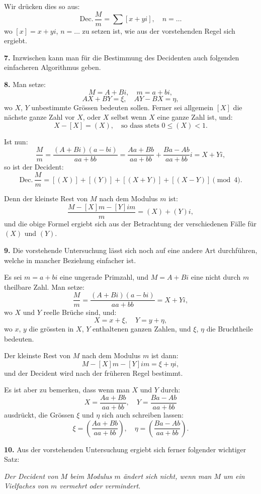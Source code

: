 \documentclass[12pt,a4paper]{article}
\begin{document}
Wir drücken dies so aus:
\[
\text{Dec.}\,\frac{M}{m} = \sum [x + yi], \quad n = \ldots
\]
wo $[x] = x + yi$, $n = \ldots$ zu setzen ist, wie aus der vorstehenden Regel sich ergiebt.

\textbf{7.} Inzwischen kann man für die Bestimmung des Decidenten auch folgenden einfacheren
Algorithmus geben.

\textbf{8.} Man setze:
\[
M = A + Bi, \quad m = a + bi,
\]
\[
AX + BY = \xi, \quad AY - BX = \eta,
\]
wo $X$, $Y$ unbestimmte Grössen bedeuten sollen. Ferner sei allgemein $[X]$ die nächste ganze
Zahl vor $X$, oder $X$ selbst wenn $X$ eine ganze Zahl ist, und:
\[
X - [X] = (X), \quad \text{so dass stets } 0 \leq (X) < 1.
\]

Ist nun:
\[
\frac{M}{m} = \frac{(A + Bi)(a - bi)}{aa + bb} = \frac{Aa + Bb}{aa + bb} + \frac{Ba - Ab}{aa + bb}i = X + Yi,
\]
so ist der Decident:
\[
\text{Dec.}\,\frac{M}{m} = [(X)] + [(Y)] + [(X + Y)] + [(X - Y)] \pmod{4}.
\]

Denn der kleinste Rest von $M$ nach dem Modulus $m$ ist:
\[
\frac{M - [X]m - [Y]im}{m} = (X) + (Y)i,
\]
und die obige Formel ergiebt sich aus der Betrachtung der verschiedenen Fälle für $(X)$ und $(Y)$.


\textbf{9.} Die vorstehende Untersuchung lässt sich noch auf eine andere Art durchführen, welche
in mancher Beziehung einfacher ist.

Es sei $m = a + bi$ eine ungerade Primzahl, und $M = A + Bi$ eine nicht durch $m$ theilbare
Zahl. Man setze:
\[
\frac{M}{m} = \frac{(A + Bi)(a - bi)}{aa + bb} = X + Yi,
\]
wo $X$ und $Y$ reelle Brüche sind, und:
\[
X = x + \xi, \quad Y = y + \eta,
\]
wo $x$, $y$ die grössten in $X$, $Y$ enthaltenen ganzen Zahlen, und $\xi$, $\eta$ die Bruchtheile bedeuten.

Der kleinste Rest von $M$ nach dem Modulus $m$ ist dann:
\[
M - [X]m - [Y]im = \xi + \eta i,
\]
und der Decident wird nach der früheren Regel bestimmt.

Es ist aber zu bemerken, dass wenn man $X$ und $Y$ durch:
\[
X = \frac{Aa + Bb}{aa + bb}, \quad Y = \frac{Ba - Ab}{aa + bb}
\]
ausdrückt, die Grössen $\xi$ und $\eta$ sich auch schreiben lassen:
\[
\xi = \left(\frac{Aa + Bb}{aa + bb}\right), \quad \eta = \left(\frac{Ba - Ab}{aa + bb}\right).
\]

\textbf{10.} Aus der vorstehenden Untersuchung ergiebt sich ferner folgender wichtiger Satz:

\textit{Der Decident von $M$ beim Modulus $m$ ändert sich nicht, wenn man $M$ um ein Vielfaches
von $m$ vermehrt oder vermindert.}
\end{document}
